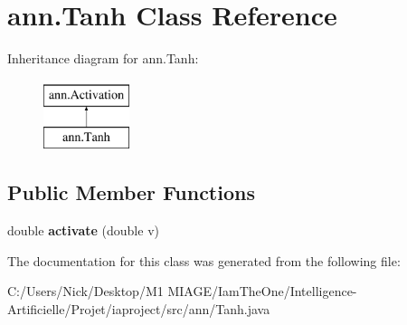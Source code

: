 \hypertarget{classann_1_1_tanh}{}\section{ann.\+Tanh Class Reference}
\label{classann_1_1_tanh}
Inheritance diagram for ann.\+Tanh\+:\begin{figure}[H]
\begin{center}
\leavevmode
\includegraphics[height=2.000000cm]{classann_1_1_tanh}
\end{center}
\end{figure}
\subsection*{Public Member Functions}
\begin{DoxyCompactItemize}
\item 
\mbox{\label{classann_1_1_tanh_a652b75e98b7ad29e16af82769df6b171}} 
double {\bfseries activate} (double v)
\end{DoxyCompactItemize}


The documentation for this class was generated from the following file\+:\begin{DoxyCompactItemize}
\item 
C\+:/\+Users/\+Nick/\+Desktop/\+M1 M\+I\+A\+G\+E/\+Iam\+The\+One/\+Intelligence-\/\+Artificielle/\+Projet/iaproject/src/ann/Tanh.\+java\end{DoxyCompactItemize}
